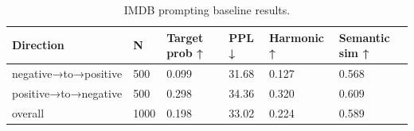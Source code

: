 \begin{table}[t]
\centering
\small
\begin{tabular}{llllll}
\toprule
Direction & N & Target prob ↑ & PPL ↓ & Harmonic ↑ & Semantic sim ↑ \\
\midrule
negative→to→positive & 500 & 0.099 & 31.68 & 0.127 & 0.568 \\
positive→to→negative & 500 & 0.298 & 34.36 & 0.320 & 0.609 \\
overall & 1000 & 0.198 & 33.02 & 0.224 & 0.589 \\
\bottomrule
\end{tabular}
\caption{IMDB prompting baseline results.}
\label{tab:imdb-prompt}
\end{table}
